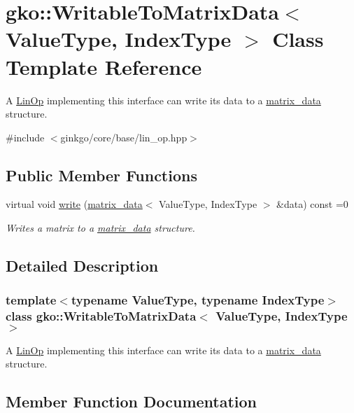 \hypertarget{classgko_1_1WritableToMatrixData}{}\section{gko\+:\+:Writable\+To\+Matrix\+Data$<$ Value\+Type, Index\+Type $>$ Class Template Reference}
\label{classgko_1_1WritableToMatrixData}


A \hyperlink{classgko_1_1LinOp}{Lin\+Op} implementing this interface can write its data to a \hyperlink{structgko_1_1matrix__data}{matrix\+\_\+data} structure.  




{\ttfamily \#include $<$ginkgo/core/base/lin\+\_\+op.\+hpp$>$}

\subsection*{Public Member Functions}
\begin{DoxyCompactItemize}
\item 
virtual void \hyperlink{classgko_1_1WritableToMatrixData_a96036c3a4bf4c67fa93002808b8b14e2}{write} (\hyperlink{structgko_1_1matrix__data}{matrix\+\_\+data}$<$ Value\+Type, Index\+Type $>$ \&data) const =0
\begin{DoxyCompactList}\small\item\em Writes a matrix to a \hyperlink{structgko_1_1matrix__data}{matrix\+\_\+data} structure. \end{DoxyCompactList}\end{DoxyCompactItemize}


\subsection{Detailed Description}
\subsubsection*{template$<$typename Value\+Type, typename Index\+Type$>$\newline
class gko\+::\+Writable\+To\+Matrix\+Data$<$ Value\+Type, Index\+Type $>$}

A \hyperlink{classgko_1_1LinOp}{Lin\+Op} implementing this interface can write its data to a \hyperlink{structgko_1_1matrix__data}{matrix\+\_\+data} structure. 

\subsection{Member Function Documentation}
\mbox{\label{classgko_1_1WritableToMatrixData_a96036c3a4bf4c67fa93002808b8b14e2}} 
